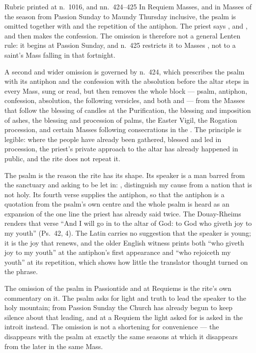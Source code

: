 \begin{rubricnote}{Rubric printed at n.~1016, and  nn.~424--425}
In Requiem Masses, and in Masses of the season from Passion Sunday to Maundy
Thursday inclusive, the psalm  is omitted together
with  and the repetition of the antiphon. The priest
says ,  and
, and then makes the confession. The omission is
therefore not a general Lenten rule: it begins at Passion Sunday, and n.~425
restricts it to Masses , not to a saint's Mass falling in
that fortnight.\par
A second and wider omission is governed by n.~424, which prescribes the psalm
with its antiphon and the confession with the absolution before the altar
steps in every Mass, sung or read, but then removes the whole block ---
psalm, antiphon, confession, absolution, the following versicles, and both
 and  --- from the Masses that
follow the blessing of candles at the Purification, the blessing and imposition
of ashes, the blessing and procession of palms, the Easter Vigil, the Rogation
procession, and certain Masses following consecrations in the . The principle is legible: where the people have already been
gathered, blessed and led in procession, the priest's private approach to the
altar has already happened in public, and the rite does not repeat it.
\end{rubricnote}

The psalm is the reason the rite has its shape. Its speaker is a man barred
from the sanctuary and asking to be let in: , distinguish my cause from a nation that is not holy. Its
fourth verse supplies the antiphon, so that the antiphon is a quotation from
the psalm's own centre and the whole psalm is heard as an expansion of the one
line the priest has already said twice. The Douay-Rheims renders that verse
``And I will go in to the altar of God: to God who giveth joy to my youth''
(Ps.~42, 4). The Latin  carries no suggestion that
the speaker is young; it is the joy that renews, and the older English witness
prints both ``who giveth joy to my youth'' at the antiphon's first appearance
and ``who rejoiceth my youth'' at its repetition, which shows how little the
translator thought turned on the phrase.

The omission of the psalm in Passiontide and at Requiems is the rite's own
commentary on it. The psalm asks for light and truth to lead the speaker to the
holy mountain; from Passion Sunday the Church has already begun to keep silence
about that leading, and at a Requiem the light asked for is asked in the
introit instead. The omission is not a shortening for convenience --- the
 disappears with the psalm at exactly the same seasons
at which it disappears from the  later in the same Mass.

